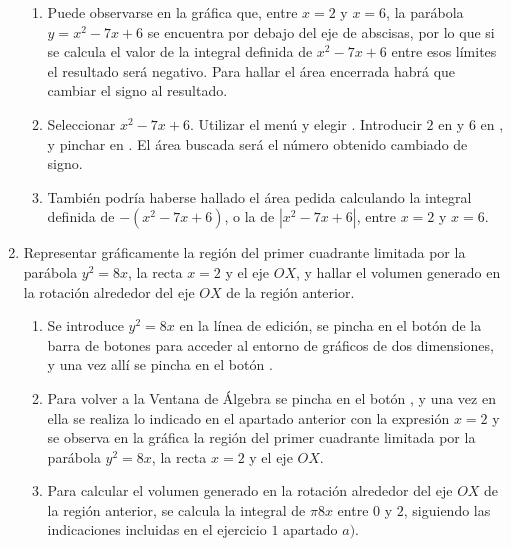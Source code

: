 \begin{enumerate}[leftmargin=*]
\begin{indicacion}
{\begin{enumerate}
\item Puede observarse en la gráfica que, entre $x=2$ y $x=6$,
la parábola $y=x^{2}-7x+6$ se encuentra por debajo del eje de
abscisas, por lo que si se calcula el valor de la integral definida
de $x^{2}-7x+6$ entre esos límites el resultado será negativo. Para
hallar el área encerrada habrá que cambiar el signo al resultado.

\item Seleccionar $x^{2}-7x+6$. Utilizar el menú  y elegir
. Introducir $2$ en  y $6$ en , y pinchar en
. El área buscada será el número obtenido
cambiado de signo.

\item También podría haberse hallado el área pedida calculando la integral definida de $-(x^{2}-7x+6)$, o la de
$|x^{2}-7x+6|$, entre $x=2$ y $x=6$.
\end{enumerate}
}
\end{indicacion}

\item  Representar gráficamente la región del primer cuadrante limitada
por la parábola $y^{2}=8x$, la recta $x=2$ y el eje $OX$, y hallar
el volumen generado en la rotación alrededor del eje $OX$ de la
región anterior.


\begin{indicacion}
{
\begin{enumerate}

\item Se introduce $y^{2}=8x$ en la línea de edición, se pincha en el botón
  de la barra de botones para acceder al entorno de gráficos de dos dimensiones, y
una vez allí se pincha en el botón .

\item Para volver a la Ventana de Álgebra se pincha en el botón
, y una vez en ella se realiza
lo indicado en el apartado anterior con la expresión $x=2$ y se
observa en la gráfica la región del primer cuadrante limitada por la
parábola $y^{2}=8x$, la recta $x=2$ y el eje $OX$.

\item Para calcular el volumen generado en la rotación alrededor del eje $OX$ de la región anterior, se
 calcula la integral de $\pi8x$ entre $0$ y $2$, siguiendo
 las indicaciones incluidas en el ejercicio $1$ apartado $a)$.
\end{enumerate}
}
\end{indicacion}

\end{enumerate}


